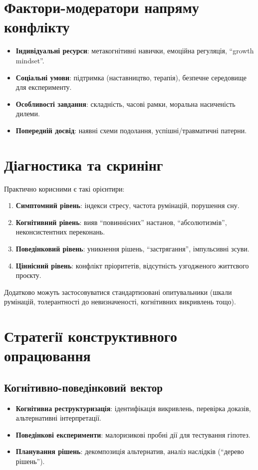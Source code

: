 \documentclass[12pt,a4paper]{article}
\newcommand{\term}[1]{\textbf{#1}}
\begin{document}
\section{Фактори-модератори напряму конфлікту}
\begin{itemize}[left=6mm]
    \item \textbf{Індивідуальні ресурси}: метакогнітивні навички, емоційна регуляція, \enquote{growth mindset}.
    \item \textbf{Соціальні умови}: підтримка (наставництво, терапія), безпечне середовище для експерименту.
    \item \textbf{Особливості завдання}: складність, часові рамки, моральна насиченість дилеми.
    \item \textbf{Попередній досвід}: наявні схеми подолання, успішні/травматичні патерни.
\end{itemize}

\section{Діагностика та скринінг}
Практично корисними є такі орієнтири:
\begin{enumerate}[left=6mm,label=\arabic*)]
    \item \term{Симптомний рівень}: індекси стресу, частота румінацій, порушення сну.
    \item \term{Когнітивний рівень}: вияв \enquote{повиннісних} настанов, \enquote{абсолютизмів}, неконсистентних переконань.
    \item \term{Поведінковий рівень}: уникнення рішень, \enquote{застрягання}, імпульсивні зсуви.
    \item \term{Ціннісний рівень}: конфлікт пріоритетів, відсутність узгодженого життєвого проєкту.
\end{enumerate}
Додатково можуть застосовуватися стандартизовані опитувальники (шкали румінацій, толерантності до невизначеності, когнітивних викривлень тощо).

\section{Стратегії конструктивного опрацювання}
\subsection{Когнітивно-поведінковий вектор}
\begin{itemize}[left=6mm]
    \item \textbf{Когнітивна реструктуризація}: ідентифікація викривлень, перевірка доказів, альтернативні інтерпретації.
    \item \textbf{Поведінкові експерименти}: малоризикові пробні дії для тестування гіпотез.
    \item \textbf{Планування рішень}: декомпозиція альтернатив, аналіз наслідків (\enquote{дерево рішень}).
\end{itemize}
\end{document}
